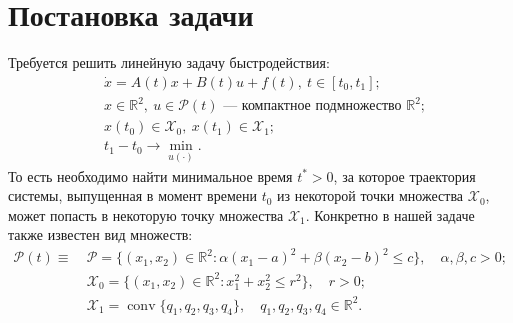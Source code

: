 \documentclass[oneside,final,11pt]{article}
\DeclareMathOperator{\conv}{conv}
\newcommand*\Rn  [1]{\mathbb{R}^{#1}}
\newcommand*\Chi {\mathcal{X}}
\newcommand*\Pset{\mathcal{P}}
\renewcommand*\leq{\leqslant}
\begin{document}
	\section{Постановка задачи}
		Требуется решить линейную задачу быстродействия:
		\begin{equation} \begin{aligned} \label{ltp}
			&\dot x = A(t)x + B(t)u +f(t), \: t \in [t_0, t_1];\\ 
			&x \in \Rn{2},\: u \in \Pset(t) \text{~--- компактное подмножество }\Rn{2};\\
			&x(t_0) \in  \Chi_0, \: x(t_1) \in \Chi_1;\\
			&t_1 - t_0 \rightarrow \min_{u\scriptscriptstyle{(\cdot)}}.
		\end{aligned} \end{equation} 
		То есть необходимо найти минимальное время \(t^*>0\), за которое траектория системы, выпущенная в момент времени \(t_0\) из некоторой точки множества \(\Chi_0\), может попасть в некоторую точку множества \(\Chi_1\). Конкретно в нашей задаче также известен вид множеств:
		\begin{equation}\begin{aligned}  \label{sets}
			\Pset(t) \equiv\: &\Pset  = \{(x_1,x_2) \in \Rn{2} : \alpha(x_1-a)^2 + \beta(x_2-b)^2 \leq c\},\quad \alpha,\beta,c > 0;\\
			&\Chi_0 = \{(x_1,x_2) \in \Rn{2} : x_1^2 + x_2^2 \leq r^2\},\quad r > 0;\\
			&\Chi_1 =\conv\{q_1,q_2,q_3,q_4\}, \quad q_1,q_2,q_3,q_4 \in \Rn{2}.\\
		\end{aligned}\end{equation}
\end{document}
